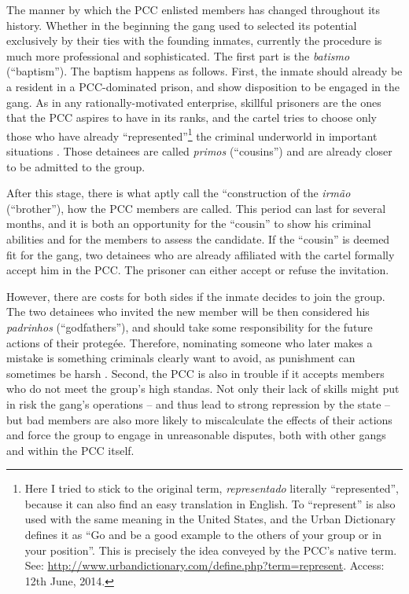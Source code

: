 The manner by which the PCC enlisted members has changed throughout its history. Whether in the beginning the gang used to selected its potential exclusively by their ties with the founding inmates, currently the procedure is much more professional and sophisticated. The first part is the \textit{batismo} (``baptism''). The baptism happens as follows. First, the inmate should already be a resident in a PCC-dominated prison, and show disposition to be engaged in the gang. As in any rationally-motivated enterprise, skillful prisoners are the ones that the PCC aspires to have in its ranks, and the cartel tries to choose only those who have already ``represented''\footnote{Here I tried to stick to the original term, \textit{representado} literally ``represented'', because it can also find an easy translation in English. To ``represent'' is also used with the same meaning in the United States, and the Urban Dictionary defines it as ``Go and be a good example to the others of your group or in your position''. This is precisely the idea conveyed by the PCC's native term. See: \href{http://www.urbandictionary.com/define.php?term=represent}{http://www.urbandictionary.com/define.php?term=represent}. Access:  12th June, 2014.} the criminal underworld in important situations \citep[99]{biondi2007relacoes}. Those detainees are called \textit{primos} (``cousins'') and are already closer to be admitted to the group. 

After this stage, there is what \citet[100]{biondi2007relacoes} aptly call the ``construction of the \textit{irm\~{a}o} (``brother''), how the PCC members are called. This period can last for several months, and it is both an opportunity for the ``cousin'' to show his criminal abilities and for the members to assess the candidate. If the ``cousin'' is deemed fit for the gang, two detainees who are already affiliated with the cartel formally accept him in the PCC. The prisoner can either accept or refuse the invitation.

However, there are costs for both sides if the inmate decides to join the group. The two detainees who invited the new member will be then considered his \textit{padrinhos} (``godfathers''), and should take some responsibility for the future actions of their proteg\'{e}e. Therefore, nominating someone who later makes a mistake is something criminals clearly want to avoid, as punishment can sometimes be harsh \citep[101]{biondi2007relacoes}. Second, the PCC is also in trouble if it accepts members who do not meet the group's high standas. Not only their lack of skills might put in risk the gang's operations -- and thus lead to strong repression by the state -- but bad members are also more likely to miscalculate the effects  of their actions and force the group to engage in unreasonable disputes, both with other gangs and within the PCC itself.


